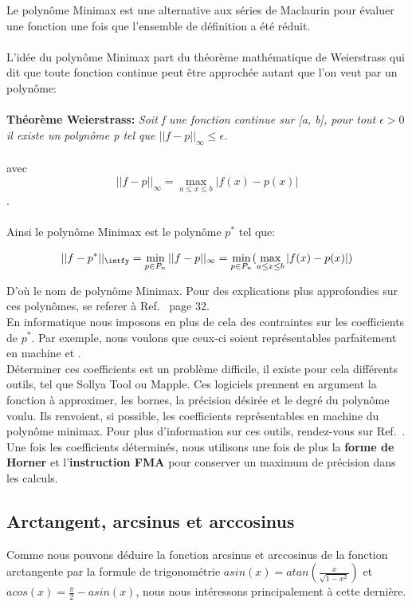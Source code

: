 \documentclass[12pt]{article}
\begin{document}
Le polynôme Minimax est une alternative aux séries de Maclaurin pour évaluer une fonction
une fois que l'ensemble de définition a été réduit.\\
\\
L'idée du polynôme Minimax part du théorème mathématique de Weierstrass qui dit que toute
fonction continue peut être approchée autant que l'on veut par un polynôme:\\
\\
\textbf{Théorème Weierstrass:} \textit{Soit f une fonction continue sur [a, b], pour tout
$\epsilon > 0$ il existe un polynôme p tel que $||f-p||_{\infty} \leq \epsilon$.}\\
\\
avec $$||f-p||_{\infty} = \max_{a \leq x \leq b}|f(x)-p(x)|$$.\\
\\
Ainsi le polynôme Minimax est le polynôme $p^*$ tel que:
\begin{center}
\begin{equation}
  ||f-p^*||_{\intfy} = \min_{p \in P_n}||f-p||_{\infty} = \min_{p \in P_n}(\max_{a \leq x \leq b}|f(x)-p(x)|)
\end{equation}
\end{center}
D'où le nom de polynôme Minimax. Pour des explications plus approfondies sur ces polynômes,
se referer à Ref.~\cite{elementaryFunctions} page 32.\\
En informatique nous imposons en plus de cela des contraintes sur les coefficients de $p^*$.
Par exemple, nous voulons que ceux-ci soient représentables parfaitement en machine et .\\
Déterminer ces coefficients est un problème difficile, il existe pour cela différents outils,
tel que Sollya Tool ou Mapple. Ces logiciels prennent en argument la fonction à approximer, les bornes, la précision
désirée et le degré du polynôme voulu. Ils renvoient, si possible, les coefficients représentables en machine
du polynôme minimax. Pour plus d'information sur ces outils, rendez-vous sur Ref.~\cite{sollya}.\\

Une fois les coefficients déterminés, nous utilisons une fois de plus la \textbf{forme de Horner}
et l'\textbf{instruction FMA} pour conserver un maximum de précision dans les calculs.

\subsection{Arctangent, arcsinus et arccosinus}
Comme nous pouvons déduire la fonction arcsinus et arccosinus de la fonction arctangente par la formule
de trigonométrie $asin(x) = atan(\frac{x}{\sqrt{1-x^2}})$ et $acos(x) = \frac{\pi}{2} - asin(x)$, nous
nous intéressons principalement à cette dernière.
\end{document}
